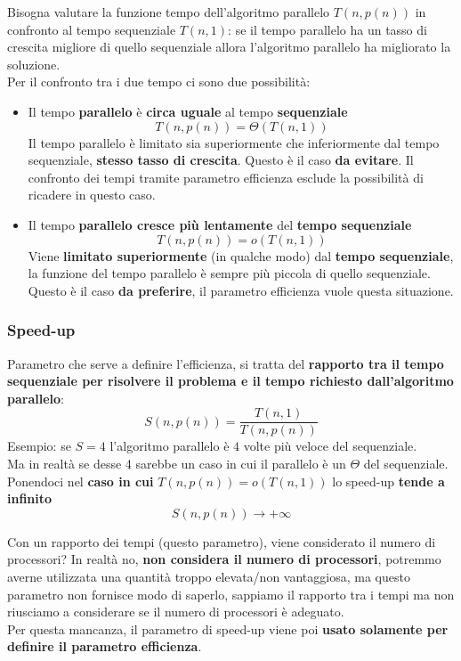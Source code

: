 \documentclass[11pt]{article}
\begin{document}
	Bisogna valutare la funzione tempo dell'algoritmo parallelo $T(n, p(n))$ in confronto al tempo sequenziale $T(n,1)$: se il tempo parallelo ha un tasso di crescita migliore di quello sequenziale allora l'algoritmo parallelo ha migliorato la soluzione.\\
	Per il confronto tra i due tempo ci sono due possibilità:
	\begin{itemize}
		\item Il tempo \textbf{parallelo} è \textbf{circa uguale} al tempo \textbf{sequenziale}
		$$ T(n, p(n)) = \Theta(T(n,1))$$
		Il tempo parallelo è limitato sia superiormente che inferiormente dal tempo sequenziale, \textbf{stesso tasso di crescita}. Questo è il caso \textbf{da evitare}. Il confronto dei tempi tramite parametro efficienza esclude la possibilità di ricadere in questo caso.\\
		
		\item Il tempo \textbf{parallelo cresce più lentamente} del \textbf{tempo sequenziale}
		$$ T(n, p(n)) = o (T(n,1))$$
		Viene \textbf{limitato superiormente} (in qualche modo) dal \textbf{tempo sequenziale}, la funzione del tempo parallelo è sempre più piccola di quello sequenziale. Questo è il caso \textbf{da preferire}, il parametro efficienza vuole questa situazione.\\
	\end{itemize}
	
	\newpage
	
	\subsubsection{Speed-up}
	Parametro che serve a definire l'efficienza, si tratta del \textbf{rapporto tra il tempo sequenziale per risolvere il problema e il tempo richiesto dall'algoritmo parallelo}:
	$$ S(n, p(n)) = \frac{T(n,1)}{T(n,p(n))} $$
	Esempio: se $S=4$ l'algoritmo parallelo è $4$ volte più veloce del sequenziale.\\
	
	Ma in realtà se desse 4 sarebbe un caso in cui il parallelo è un $\Theta$ del sequenziale. Ponendoci nel \textbf{caso in cui} $T(n, p(n)) = o (T(n, 1))$ lo speed-up \textbf{tende a infinito}
	$$ S(n, p(n)) \rightarrow + \infty $$
	
	Con un rapporto dei tempi (questo parametro), viene considerato il numero di processori? In realtà no, \textbf{non considera il numero di processori}, potremmo averne utilizzata una quantità troppo elevata/non vantaggiosa, ma questo parametro non fornisce modo di saperlo, sappiamo il rapporto tra i tempi ma non riusciamo a considerare se il numero di processori è adeguato.\\
	Per questa mancanza, il parametro di speed-up viene poi \textbf{usato solamente per definire il parametro efficienza}. \\
	
\end{document}
